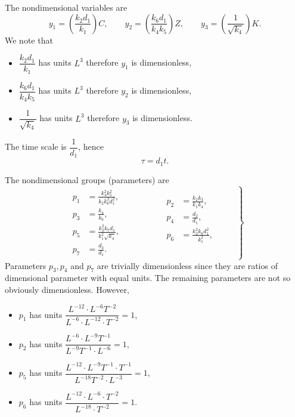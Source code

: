 \documentclass[10pt,letterpaper]{article}
\begin{document}
The nondimensional variables are
\begin{equation}\label{eq:variables}
y_1 = \left(\frac{k_2 d_1}{k_1}\right) C, \qquad
y_2 = \left(\frac{k_6 d_1}{k_4 k_5}\right) Z, \qquad
y_3 = \left(\frac{1}{\sqrt{k_4}}\right) K.
\end{equation}
We note that
\begin{itemize}
  \item $\dfrac{k_2 d_1}{k_1}$ has units $L^3$ therefore $y_1$ is dimensionless,
  \item $\dfrac{k_6 d_1}{k_4 k_5}$ has units $L^3$ therefore $y_2$ is dimensionless,
  \item $\dfrac{1}{\sqrt{k_4}}$ has units $L^3$ therefore $y_3$ is dimensionless.
\end{itemize}
 The time scale is $\dfrac{1}{d_1}$, hence
\begin{equation}
\tau = d_1 t.
\end{equation}


\bigskip
{}

The nondimensional groups (parameters) are
\begin{equation}\label{eq:parameters}
\left.
\begin{gathered}\begin{aligned}
p_1 &= \frac{k_4^2 k_5^2}{k_2 k_6^2 d_1^2},  \\
p_3 &= \frac{k_4}{k_6}, \\
p_5 &= \frac{k_2^2 k_7 d_1}{k_1^2 \sqrt{k_4}}, \\
p_7 &= \frac{d_3}{d_1}.
\end{aligned}\end{gathered}
\qquad \qquad
\begin{gathered}\begin{aligned}
p_2 &= \frac{k_2 k_3}{k_1 k_4}, \\
p_4 &= \frac{d_2}{d_1}, \\
p_6 &= \frac{k_2^2 k_8 d_1^2}{k_1^2}, \\
& \\
\end{aligned}\end{gathered}
\qquad \right \}
\end{equation}
Parameters $p_3, p_4$ and $p_7$ are trivially dimensionless  since they are ratios of dimensional parameter with equal units. The remaining parameters are not so obviously dimensionless. However,
\begin{itemize}
  \item $p_1$ has units $\dfrac{L^{-12}\cdot L^{-6}T^{-2}}  {L^{-6} \cdot L^{-12} \cdot T^{-2}} = 1$,
  \item $p_2$ has units $\dfrac{L^{-6} \cdot L^{-9}T^{-1}}  {L^{-9} T^{-1} \cdot L^{-6}} = 1$,
  \item $p_5$ has units $\dfrac{L^{-12}\cdot L^{-9}T^{-1} \cdot T^{-1} }  {L^{-18} T^{-2} \cdot L^{-3}} = 1$,
  \item $p_6$ has units $\dfrac{L^{-12}\cdot L^{-6} \cdot T^{-2}}  {L^{-18}\cdot T^{-2}} = 1$.
\end{itemize}
\end{document}
